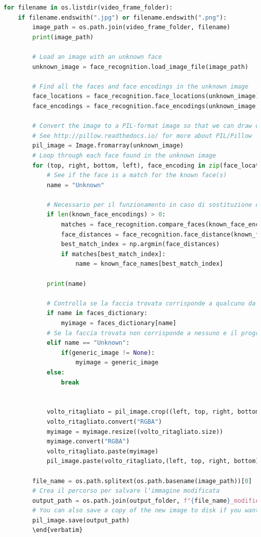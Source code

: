 \documentclass{report}
\begin{document}
\begin{lstlisting}[language=Python, breaklines=true, frame=single]
for filename in os.listdir(video_frame_folder):
    if filename.endswith(".jpg") or filename.endswith(".png"):
        image_path = os.path.join(video_frame_folder, filename)
        print(image_path)

        # Load an image with an unknown face
        unknown_image = face_recognition.load_image_file(image_path)

        # Find all the faces and face encodings in the unknown image
        face_locations = face_recognition.face_locations(unknown_image)
        face_encodings = face_recognition.face_encodings(unknown_image, face_locations)

        # Convert the image to a PIL-format image so that we can draw on top of it with the Pillow library
        # See http://pillow.readthedocs.io/ for more about PIL/Pillow
        pil_image = Image.fromarray(unknown_image)
        # Loop through each face found in the unknown image
        for (top, right, bottom, left), face_encoding in zip(face_locations, face_encodings):
            # See if the face is a match for the known face(s)
            name = "Unknown"

            # Necessario per il funzionamento in caso di sostituzione di tutte le facce senza facce da identificare
            if len(known_face_encodings) > 0:
                matches = face_recognition.compare_faces(known_face_encodings, face_encoding)
                face_distances = face_recognition.face_distance(known_face_encodings, face_encoding)
                best_match_index = np.argmin(face_distances)
                if matches[best_match_index]:
                    name = known_face_names[best_match_index]

            print(name)

            # Controlla se la faccia trovata corrisponde a qualcuno da indentificare
            if name in faces_dictionary:
                myimage = faces_dictionary[name]
            # Se la faccia trovata non corrisponde a nessuno e il programma ha arg -a sostituisci con immagine generica
            elif name == "Unknown":
                if(generic_image != None):
                    myimage = generic_image
            else:
                break


            volto_ritagliato = pil_image.crop((left, top, right, bottom))
            volto_ritagliato.convert("RGBA")
            myimage = myimage.resize((volto_ritagliato.size))
            myimage.convert("RGBA")
            volto_ritagliato.paste(myimage)
            pil_image.paste(volto_ritagliato,(left, top, right, bottom))

        file_name = os.path.splitext(os.path.basename(image_path))[0]
        # Crea il percorso per salvare l'immagine modificata
        output_path = os.path.join(output_folder, f"{file_name}_modified.png")
        # You can also save a copy of the new image to disk if you want by uncommenting this line
        pil_image.save(output_path)
        \end{verbatim}
\end{lstlisting}
\end{document}
